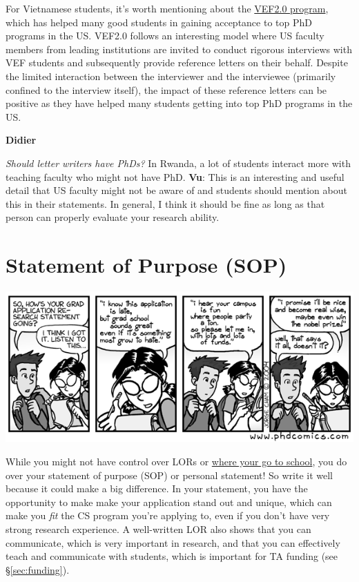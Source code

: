 \documentclass[oneside,11pt]{memoir}
\newenvironment{commentbox}[1][]{
\small
    \begin{mybox}
    {\small \textbf{#1}}
 }{
   \end{mybox}
}
\begin{document}
For Vietnamese students, it's worth mentioning about the \href{https://vef2.org/}{VEF2.0 program}, which has helped many good students in gaining acceptance to top PhD programs in the US. VEF2.0 follows an interesting model where US faculty members from leading institutions are invited to conduct rigorous interviews with VEF students and subsequently provide reference letters on their behalf. Despite the limited interaction between the interviewer and the interviewee (primarily confined to the interview itself), the impact of these reference letters can be positive as they have helped many students getting into top PhD programs in the US.

\begin{commentbox}[Didier]
\emph{Should letter writers have PhDs?}  In Rwanda, a lot of students interact more with teaching faculty who might not have PhD.
\tcblower
\textbf{Vu}: This is an interesting and useful detail that US faculty might not be aware of and students should mention about this in their statements. In general, I think it should be fine as long as that person can properly evaluate your research ability. 
\end{commentbox}

\section{Statement of Purpose (SOP)}\label{sec:research-statement}


    \begin{center}
      \includegraphics[scale=0.5]{c2.png}
    \end{center}

While you might not have control over LORs or \hyperref[sec:your-school]{where your go to school}, you do over your
statement of purpose (SOP) or personal statement! So write it well because it could make a big difference.
In your statement, you have the opportunity to make  make your application stand out and unique, which can make you \emph{fit} the CS program you're applying to, even if you don't have very strong research experience.
A well-written LOR also shows that you can communicate, which is very important in research, and that you can effectively teach and communicate with students, which is important for TA funding (see \S\ref{sec:funding}).
\end{document}
